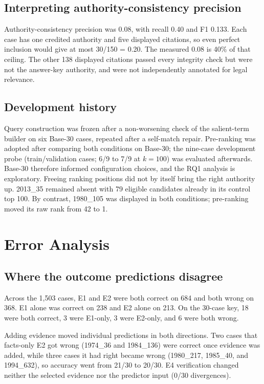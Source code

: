 \documentclass[conference]{IEEEtran}
\begin{document}
\subsection{Interpreting authority-consistency precision}
Authority-consistency precision was 0.08, with recall 0.40 and F1 0.133. Each case has one credited authority and five displayed citations, so even perfect inclusion would give at most 30/150 = 0.20. The measured 0.08 is 40\% of that ceiling. The other 138 displayed citations passed every integrity check but were not the answer-key authority, and were not independently annotated for legal relevance.

\subsection{Development history}
Query construction was frozen after a non-worsening check of the salient-term builder on six Base-30 cases, repeated after a self-match repair. Pre-ranking was adopted after comparing both conditions on Base-30; the nine-case development probe (train/validation cases; 6/9 to 7/9 at $k=100$) was evaluated afterwards. Base-30 therefore informed configuration choices, and the RQ1 analysis is exploratory. Freeing ranking positions did not by itself bring the right authority up. 2013\_35 remained absent with 79 eligible candidates already in its control top 100. By contrast, 1980\_105 was displayed in both conditions; pre-ranking moved its raw rank from 42 to 1.

\section{Error Analysis}
\subsection{Where the outcome predictions disagree}
Across the 1,503 cases, E1 and E2 were both correct on 684 and both wrong on 368. E1 alone was correct on 238 and E2 alone on 213. On the 30-case key, 18 were both correct, 3 were E1-only, 3 were E2-only, and 6 were both wrong.

Adding evidence moved individual predictions in both directions. Two cases that facts-only E2 got wrong (1974\_36 and 1984\_136) were correct once evidence was added, while three cases it had right became wrong (1980\_217, 1985\_40, and 1994\_632), so accuracy went from 21/30 to 20/30. E4 verification changed neither the selected evidence nor the predictor input (0/30 divergences).
\end{document}
